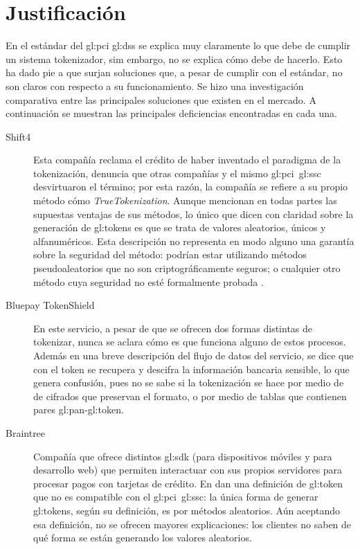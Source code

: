\section{Justificación}


En el estándar del \gls{gl:pci} \gls{gl:dss} se explica muy claramente lo que
debe de cumplir un sistema tokenizador, sim embargo, no se explica cómo debe de
hacerlo. Esto ha dado pie a que surjan soluciones que, a pesar de cumplir con
el estándar, no son claros con respecto a su funcionamiento. Se hizo una
investigación comparativa entre las principales soluciones que existen en el
mercado. A continuación se muestran las principales deficiencias encontradas
en cada una.

\begin{description}

  \item[Shift4]
    Esta compañía reclama el crédito de haber inventado el paradigma de
    la tokenización, denuncia que otras compañías y el mismo
    \gls{gl:pci}~\gls{gl:ssc} desvirtuaron el término; por esta razón, la
    compañía se refiere a su propio método cómo \textit{TrueTokenization}.
    Aunque mencionan en todas partes las supuestas ventajas de sus métodos,
    lo único que dicen con claridad sobre la generación de \glspl{gl:token} es
    que se trata de valores aleatorios, únicos y alfanuméricos. Esta descripción
    no representa en modo alguno una garantía sobre la seguridad del
    método: podrían estar utilizando métodos pseudoaleatorios que no son
    criptográficamente seguros; o cualquier otro método cuya seguridad no esté
    formalmente probada \cite{shif4_uno, shif4_dos}.

  \item[Bluepay TokenShield]
    En este servicio, a pesar de que se ofrecen dos formas distintas de
    tokenizar, nunca se aclara cómo es que funciona alguno de estos procesos.
    Además en una breve descripción del flujo de datos del servicio, se dice
    que con el token se recupera y descifra la información bancaria sensible,
    lo que genera confusión, pues no se sabe si la tokenización se hace por
    medio de de cifrados que preservan el formato, o por medio de tablas que
    contienen pares \gls{gl:pan}-\gls{gl:token}.

  \item[Braintree]
    Compañía que ofrece distintos \gls{gl:sdk} (para dispositivos móviles y
    para desarrollo web) que permiten interactuar con sus propios servidores
    para procesar pagos con tarjetas de crédito. En \cite{braintree_uno}
    dan una definición de \gls{gl:token} que no es compatible con el
    \gls{gl:pci}~\gls{gl:ssc}: la única forma de generar \glspl{gl:token},
    según su definición, es por métodos aleatorios. Aún aceptando
    esa definición, no se ofrecen mayores explicaciones: los clientes no
    saben de qué forma se están generando los valores aleatorios.


\end{description}
